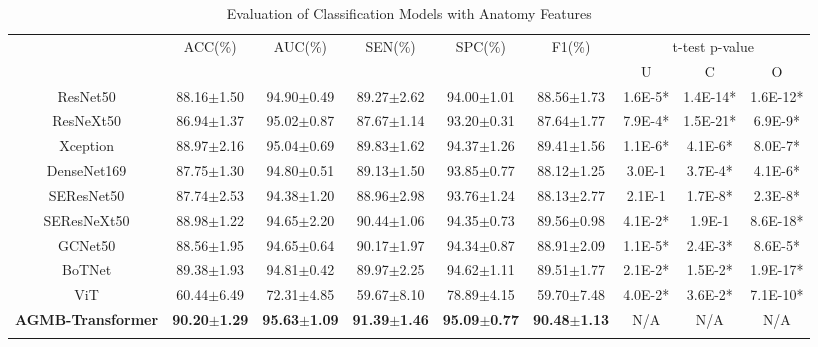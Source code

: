\documentclass[journal]{IEEEtran}
\begin{document}
\begin{table*}[ht]
\centering
\renewcommand\arraystretch{1.2}
\caption{Evaluation of Classification Models with Anatomy Features}
\begin{tabular}{c|ccccc|ccc}
\Xhline{1pt}
\multirow{2}{*}{Model} & \multirow{2}{*}{ACC(\%)} & \multirow{2}{*}{AUC(\%)} & \multirow{2}{*}{SEN(\%)} & \multirow{2}{*}{SPC(\%)} & \multirow{2}{*}{F1(\%)} & \multicolumn{3}{c}{t-test p-value} \\ \cline{7-9} 
                       &                          &                          &                          &                          &                         &  U        & C      & O    \\ \hline

ResNet50               & 88.16$\pm$1.50      & 94.90$\pm$0.49       & 89.27$\pm$2.62     & 94.00$\pm$1.01    & 88.56$\pm$1.73     & 1.6E-5*             & 1.4E-14* & 1.6E-12*           \\\cline{1-9}

ResNeXt50              & 86.94$\pm$1.37       & 95.02$\pm$0.87      & 87.67$\pm$1.14        & 93.20$\pm$0.31     & 87.64$\pm$1.77   & 7.9E-4*    & 1.5E-21*  & 6.9E-9*         \\\cline{1-9}
Xception            & 88.97$\pm$2.16      & 95.04$\pm$0.69    & 89.83$\pm$1.62    & 94.37$\pm$1.26      & 89.41$\pm$1.56    & 1.1E-6*    & 4.1E-6*   &   8.0E-7*        \\ \cline{1-9}

DenseNet169  & 87.75$\pm$1.30   & 94.80$\pm$0.51   & 89.13$\pm$1.50  & 93.85$\pm$0.77   & 88.12$\pm$1.25  & 3.0E-1     & 3.7E-4*   &  4.1E-6*              \\ \cline{1-9}
SEResNet50  & 87.74$\pm$2.53 & 94.38$\pm$1.20    & 88.96$\pm$2.98    & 93.76$\pm$1.24    & 88.13$\pm$2.77    & 2.1E-1     & 1.7E-8*    &   2.3E-8*         \\\cline{1-9}
SEResNeXt50  & 88.98$\pm$1.22  & 94.65$\pm$2.20    & 90.44$\pm$1.06  & 94.35$\pm$0.73     & 89.56$\pm$0.98  & 4.1E-2*  & 1.9E-1  &   8.6E-18*   \\ \cline{1-9}
GCNet50  & 88.56$\pm$1.95     & 94.65$\pm$0.64    & 90.17$\pm$1.97      & 94.34$\pm$0.87  & 88.91$\pm$2.09     & 1.1E-5*         & 2.4E-3*              &  8.6E-5*           \\ \cline{1-9}
BoTNet   & 89.38$\pm$1.93        & 94.81$\pm$0.42    & 89.97$\pm$2.25 & 94.62$\pm$1.11   & 89.51$\pm$1.77   & 2.1E-2*    & 1.5E-2*      & 1.9E-17*       \\ \cline{1-9}
ViT & 60.44$\pm$6.49   & 72.31$\pm$4.85     & 59.67$\pm$8.10   & 78.89$\pm$4.15   & 59.70$\pm$7.48     & 4.0E-2*   & 3.6E-2*      & 7.1E-10*     \\ \cline{1-9}

\textbf{AGMB-Transformer}   & \textbf{90.20$\pm$1.29} & \textbf{95.63$\pm$1.09}    & \textbf{91.39$\pm$1.46} & \textbf{95.09$\pm$0.77} & \textbf{90.48$\pm$1.13}  & N/A  & N/A  & N/A \\ \Xhline{1pt}
\end{tabular}
\label{tab5}
\end{table*}
\end{document}
